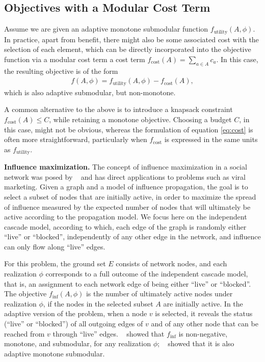 \documentclass{article}
\newcommand{\citet}[1]{\citeauthor{#1}~\shortcite{#1}}
\renewcommand{\paragraph}[1]{\vspace{0.3em}\noindent\textbf{#1.}\makebox[0.5em]{}}
\begin{document}
\subsection{Objectives with a Modular Cost Term}
Assume we are given an adaptive monotone submodular function $f_{\textrm{utility}}(A, \phi)$.
In practice, apart from benefit, there might also be some associated cost with the selection of each element, which can be directly incorporated into the objective function via a modular cost term a cost term $f_{\textrm{cost}}(A) = \sum_{a \in A} c_a$.
In this case, the resulting objective is of the form
\begin{align} \label{eq:cost}
  f(A, \phi) = f_{\textrm{utility}}(A, \phi) - f_{\textrm{cost}}(A),
\end{align}
which is also adaptive submodular, but non-monotone.

A common alternative to the above is to introduce a knapsack constraint $f_{\textrm{cost}}(A) \leq C$, while retaining a monotone objective.
Choosing a budget $C$, in this case, might not be obvious, whereas the formulation of equation \eqref{eq:cost} is often more straightforward, particularly when $f_{\textrm{cost}}$ is expressed in the same units as $f_{\textrm{utility}}$.

\paragraph{Influence maximization}
The concept of influence maximization in a social network was posed by \citet{kempe03} and has direct applications to problems such as viral marketing.
Given a graph and a model of influence propagation, the goal is to select a subset of nodes that are initially active, in order to maximize the spread of influence measured by the expected number of nodes that will ultimately be active according to the propagation model.
We focus here on the independent cascade model, according to which, each edge of the graph is randomly either ``live'' or ``blocked'', independently of any other edge in the network, and influence can only flow along ``live'' edges.

For this problem, the ground set $E$ consists of network nodes, and each realization $\phi$ corresponds to a full outcome of the independent cascade model, that is, an assignment to each network edge of being either ``live'' or ``blocked''.
The objective $f_{\textrm{inf}}(A, \phi)$ is the number of ultimately active nodes under realization $\phi$, if the nodes in the selected subset $A$ are initially active.
In the adaptive version of the problem, when a node $v$ is selected, it reveals the status (``live'' or ``blocked'') of all outgoing edges of $v$ and of any other node that can be reached from $v$ through ``live'' edges.
\citet{kempe03} showed that $f_{\textrm{inf}}$ is non-negative, monotone, and submodular, for any realization $\phi$; \citet{golovin11} showed that it is also adaptive monotone submodular.
\end{document}
